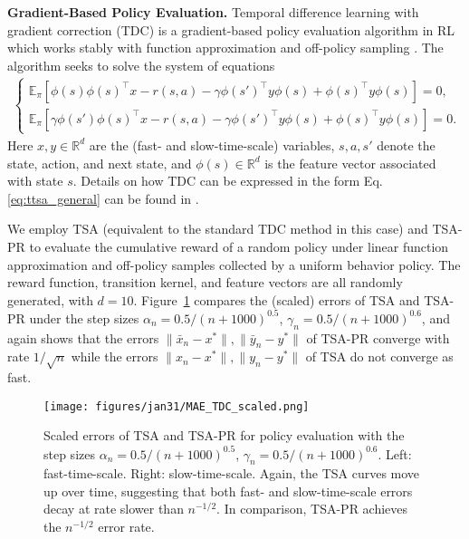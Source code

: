 \noindent\textbf{Gradient-Based Policy Evaluation.} 
Temporal difference learning with gradient correction (TDC) is a gradient-based policy evaluation algorithm in RL which works stably with function approximation and off-policy sampling \citep{sutton2009fast}. 
The algorithm seeks to solve the system of equations
\begin{align}
    \left\{\begin{array}{l}
         \mathbb{E}_{\pi}[\phi(s)\phi(s)^{\top}x - r(s, a)-\gamma \phi(s')^{\top} y \phi(s)+\phi(s)^{\top} y \phi(s)]=0 , \\
         \mathbb{E}_{\pi}[\gamma\phi(s')\phi(s)^{\top}x - r(s, a)-\gamma \phi(s')^{\top} y \phi(s)+\phi(s)^{\top} y \phi(s)]=0.
    \end{array}\right.
\end{align}
Here $x, y\in\mathbb{R}^d$ are the (fast- and slow-time-scale) variables, $s,a,s'$ denote the state, action, and next state, and $\phi(s)\in\mathbb{R}^d$ is the feature vector associated with state $s$. 
Details on how TDC can be expressed in the form Eq. \eqref{eq:ttsa_general} can be found in \citep{xu2019two,zeng2024fast}.


We employ TSA (equivalent to the standard TDC method in this case) and TSA-PR to evaluate the cumulative reward of a random policy under linear function approximation and off-policy samples collected by a uniform behavior policy. The reward function, transition kernel, and feature vectors are all randomly generated, with $d=10$. 
Figure~\ref{fig:TDC} compares the (scaled) errors of TSA and TSA-PR under the step sizes $\alpha_n=0.5/(n+1000)^{0.5}$, $\gamma_n=0.5/(n+1000)^{0.6}$, and again shows that the errors $\lVert \bar{x}_n - x^*\rVert,\lVert \bar{y}_n - y^*\rVert$ of TSA-PR converge with rate $1/\sqrt{n}$ while the errors $\lVert x_n - x^*\rVert,\lVert y_n - y^*\rVert$ of TSA do not converge as fast.

\begin{figure}[htbp]
    \centering
    \begin{minipage}[t]{\textwidth}
        \centering
        \texttt{[image: figures/jan31/MAE\_TDC\_scaled.png]}
    \end{minipage}
    \vspace{-20pt}
    \caption{
    Scaled errors of TSA and TSA-PR for policy evaluation with the step sizes $\alpha_n=0.5/(n+1000)^{0.5}$, $\gamma_n=0.5/(n+1000)^{0.6}$. Left: fast-time-scale. Right: slow-time-scale.
    Again, the TSA curves move up over time, suggesting that both fast- and slow-time-scale errors decay at rate slower than $n^{-1/2}$. 
    In comparison, TSA-PR achieves the $n^{-1/2}$ error rate.}
    \label{fig:TDC}
\end{figure}




